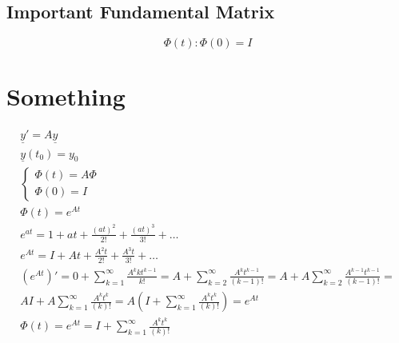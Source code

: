 \documentclass[fleqn]{report}
\newcommand{\equations} [1] {
\begin{gather*}
#1
\end{gather*}
}
\begin{document}
\subsection{Important Fundamental Matrix}
\[
\Phi(t): \Phi(0) = I
\]

\section{Something}
\equations{
\underline y' = A \underline y
\\
\underline y (t_0) = y_0
\\
\begin{cases}
\Phi (t) = A \Phi
\\
\Phi (0) = I
\end{cases}
\\
\Phi (t) = e^{At}
\\
e^{at} = 1 + at + \frac{(at)^2}{2!} + \frac{(at)^3}{3!} + \ldots
\\
e^{At} = I + At + \frac{A^2 t}{2!} + \frac{A^3 t}{3!} + \ldots 
\\
(e^{A t})' = 
0 + \sum^{\infty}_{k = 1} \frac{A^k k t^{k - 1}}{k!}
=
A + \sum^{\infty}_{k = 2} \frac{A^k t^{k - 1}}{(k - 1)!}
=
A + A \sum^{\infty}_{k = 2} \frac{A^{k - 1} t^{k - 1}}{(k - 1)!}
=
\\
A I + A \sum^{\infty}_{k = 1} \frac{A^{k} t^{k} } { (k)! }
=
A \left( I + \sum^{\infty}_{k = 1} \frac{A^{k} t^{k} } { (k)! } \right) = e^{A t}
\\
\Phi (t) = e^{A t} = I + \sum^{\infty}_{k = 1} \frac{A^{k} t^{k} } { (k)! } 
\\
}
\end{document}
